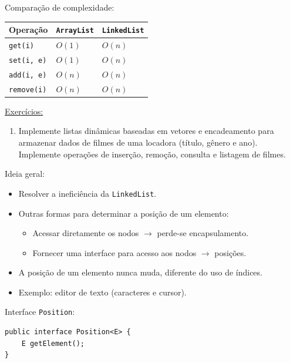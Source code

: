 \medskip

Comparação de complexidade:

\begin{table}[H]
	\centering
	\begin{tabular}{lll}
		\hline
		Operação & \texttt{ArrayList} & \texttt{LinkedList} \\
		\hline
		\texttt{get(i)} & $O(1)$ & $O(n)$ \\
		\texttt{set(i,\,e)} & $O(1)$ & $O(n)$\\
		\texttt{add(i,\,e)} & $O(n)$& $O(n)$\\
		\texttt{remove(i)} & $O(n)$ &$O(n)$ \\
		\hline
	\end{tabular}
\end{table}

\medskip

\underline{Exercícios:}
\begin{enumerate}
	\item Implemente listas dinâmicas baseadas em vetores e encadeamento para armazenar dados de filmes de uma locadora (título, gênero e ano). Implemente operações de inserção, remoção, consulta e listagem de filmes.
\end{enumerate}

\clearpage


Ideia geral:
\begin{itemize}
	\item Resolver a ineficiência da \texttt{LinkedList}.
	\item Outras formas para determinar a posição de um elemento:
	\begin{itemize}
		\item Acessar diretamente os nodos $\to$ perde-se encapsulamento.
		\item Fornecer uma interface para acesso aos nodos $\to$ posições.
	\end{itemize}
	\item A posição de um elemento nunca muda, diferente do uso de índices.
	\item Exemplo: editor de texto (caracteres e cursor).
\end{itemize}

\medskip

Interface \texttt{Position}:
\begin{verbatim}
public interface Position<E> {
	E getElement();
}
\end{verbatim}

